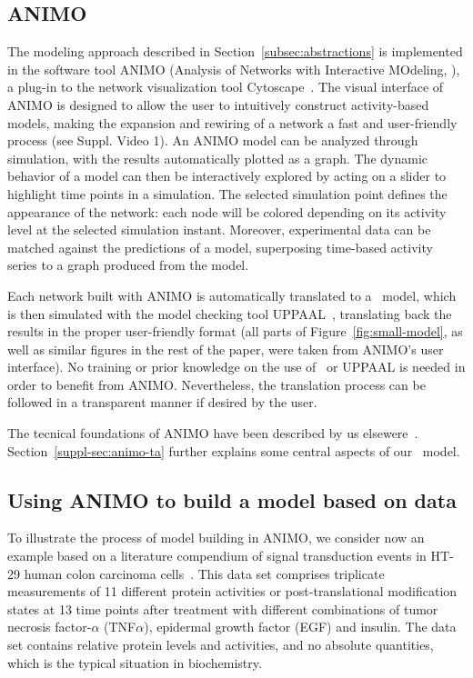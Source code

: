 \subsection{ANIMO}
The modeling approach described in Section~\ref{subsec:abstractions} is implemented in the
software tool ANIMO (Analysis of Networks with Interactive MOdeling, \citealt{animo-bibe}),
a plug-in to the network visualization tool Cytoscape~\citep{cytoscape}. The visual interface of ANIMO
is designed to allow the user to intuitively construct activity-based models, making the expansion
and rewiring of a network a fast and user-friendly process (see Suppl. Video 1). An ANIMO model can
be analyzed through simulation, with the results automatically plotted as a graph.
The dynamic behavior of a model can then be interactively explored by
acting on a slider to highlight time points in a simulation. The selected simulation
point defines the appearance of the network: each node will be colored depending on its activity level
at the selected simulation instant. Moreover, experimental data can be matched against
the predictions of a model, superposing time-based activity series to a graph produced from the model.


Each network built with ANIMO is automatically translated to
a \tas\ model, which is then simulated with the model checking tool UPPAAL~\citep{uppaal},
translating back the results in the proper user-friendly format
(all parts of Figure~\ref{fig:small-model}, as well as similar figures
in the rest of the paper, were taken from ANIMO's user interface).
No training
or prior knowledge on the use of \tas\ or UPPAAL is needed in order to benefit from ANIMO.
Nevertheless, the translation process can be followed in a transparent manner if
desired by the user.

The tecnical foundations of ANIMO have been described by us elsewere~\citep{animo-bibe}. 
Section~\ref{suppl-sec:animo-ta} further explains some central aspects of our \tas\ model.


\subsection{Using ANIMO to build a model based on data}\label{subsec:case-study}
To illustrate the process of model building in ANIMO, we consider now an example based on a literature compendium of
signal transduction events in HT-29 human colon carcinoma cells~\citep{pathway-compendium}. This data set comprises triplicate
measurements of 11 different protein activities or post-translational modification states at 13 time points after
treatment with different combinations of tumor necrosis factor-$\alpha$ (TNF$\alpha$), epidermal growth factor (EGF) and insulin.
The data set contains relative protein levels and activities, and no absolute quantities, which is the typical situation in biochemistry.

